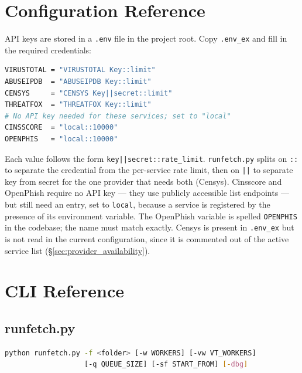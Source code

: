 
\appendix

\chapter{Configuration Reference}
\label{app:config}

API keys are stored in a \texttt{.env} file in the project root. Copy \texttt{.env\_ex} and fill
in the required credentials:
\begin{lstlisting}[language=bash, caption={Example .env configuration}]
VIRUSTOTAL = "VIRUSTOTAL Key::limit"
ABUSEIPDB  = "ABUSEIPDB Key::limit"
CENSYS     = "CENSYS Key||secret::limit"
THREATFOX  = "THREATFOX Key::limit"
# No API key needed for these services; set to "local"
CINSSCORE  = "local::10000"
OPENPHIS   = "local::10000"
\end{lstlisting}

Each value follows the form \texttt{key||secret::rate\_limit}. \texttt{runfetch.py} splits on
\texttt{::} to separate the credential from the per-service rate limit, then on \texttt{||} to
separate key from secret for the one provider that needs both (Censys). Cinsscore and OpenPhish
require no API key --- they use publicly accessible list endpoints --- but still need an entry, set
to \texttt{local}, because a service is registered by the presence of its environment variable.
The OpenPhish variable is spelled \texttt{OPENPHIS} in the codebase; the name must match exactly.
Censys is present in \texttt{.env\_ex} but is not read in the current configuration, since it is
commented out of the active service list (\S\ref{sec:provider_availability}).

\chapter{CLI Reference}
\label{app:cli}

\section{runfetch.py}

\begin{lstlisting}[language=bash]
python runfetch.py -f <folder> [-w WORKERS] [-vw VT_WORKERS]
                   [-q QUEUE_SIZE] [-sf START_FROM] [-dbg]
\end{lstlisting}

